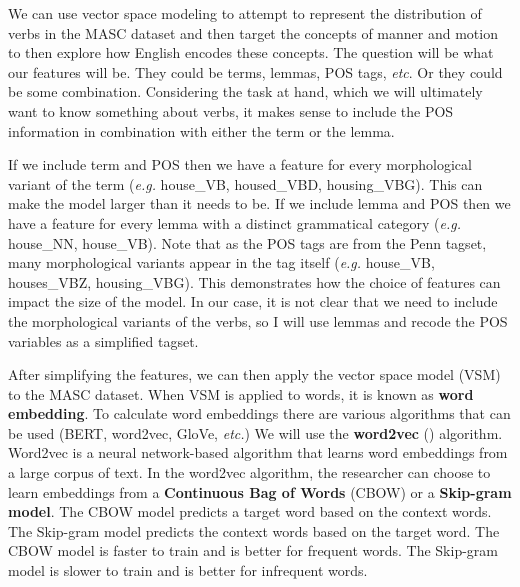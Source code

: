 \documentclass[
  letterpaper,
  krantz1]{latex/krantz-mod}
\theoremstyle{definition}
\theoremstyle{definition}
\theoremstyle{remark}
\begin{document}
We can use vector space modeling to attempt to represent the
distribution of verbs in the MASC dataset and then target the concepts
of manner and motion to then explore how English encodes these concepts.
The question will be what our features will be. They could be terms,
lemmas, POS tags, \emph{etc}. Or they could be some combination.
Considering the task at hand, which we will ultimately want to know
something about verbs, it makes sense to include the POS information in
combination with either the term or the lemma.

If we include term and POS then we have a feature for every
morphological variant of the term (\emph{e.g.} house\_VB, housed\_VBD,
housing\_VBG). This can make the model larger than it needs to be. If we
include lemma and POS then we have a feature for every lemma with a
distinct grammatical category (\emph{e.g.}
house\_NN, house\_VB). Note that as the POS tags are from the Penn
tagset, many morphological variants appear in the tag itself
(\emph{e.g.} house\_VB, houses\_VBZ, housing\_VBG). This demonstrates
how the choice of features can impact the size of the model. In our
case, it is not clear that we need to include the morphological variants
of the verbs, so I will use lemmas and recode the POS variables as a
simplified tagset.

After simplifying the features, we can then apply the vector space model
(VSM) to the MASC dataset. When VSM is
applied to words, it is known as \textbf{word
embedding}. To calculate word embeddings there
are various algorithms that can be used (BERT, word2vec, GloVe,
\emph{etc.}) We will use the \textbf{word2vec}
() algorithm. Word2vec is a neural network-based algorithm that
learns word embeddings from a large corpus of text. In the word2vec
algorithm, the researcher can choose to learn embeddings from a
\textbf{Continuous Bag of Words}
(CBOW) or a \textbf{Skip-gram
model}. The CBOW model predicts a target word
based on the context words. The Skip-gram model predicts the context
words based on the target word. The CBOW model is faster to train and is
better for frequent words. The Skip-gram model is slower to train and is
better for infrequent words.
\end{document}
